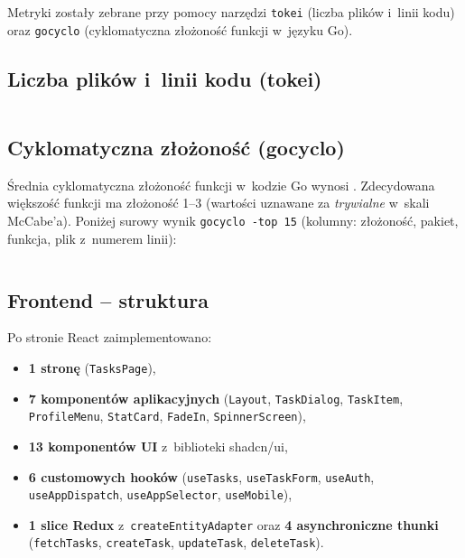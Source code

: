 \documentclass[12pt, a4paper, oneside]{article}
\begin{document}
Metryki zostały zebrane przy pomocy narzędzi \texttt{tokei} (liczba
plików i~linii kodu) oraz \texttt{gocyclo} (cyklomatyczna złożoność
funkcji w~języku Go).



\subsection{Liczba plików i~linii kodu (tokei)}

\inputminted[fontsize=\footnotesize,linenos=false,frame=single,breaklines=true]{text}{generated/tokei.txt}

\subsection{Cyklomatyczna złożoność (gocyclo)}

Średnia cyklomatyczna złożoność funkcji w~kodzie Go wynosi
\textbf{\metricsAvgCC}. Zdecydowana większość funkcji ma złożoność
1--3 (wartości uznawane za \emph{trywialne} w~skali McCabe'a).
Poniżej surowy wynik \texttt{gocyclo -top 15} (kolumny: złożoność,
pakiet, funkcja, plik z~numerem linii):

\inputminted[fontsize=\footnotesize,linenos=false,frame=single,breaklines=true]{text}{generated/gocyclo.txt}

\subsection{Frontend -- struktura}
Po stronie React zaimplementowano:
\begin{itemize}
  \item \textbf{1 stronę} (\texttt{TasksPage}),
  \item \textbf{7 komponentów aplikacyjnych} (\texttt{Layout}, \texttt{TaskDialog},
        \texttt{TaskItem}, \texttt{ProfileMenu}, \texttt{StatCard},
        \texttt{FadeIn}, \texttt{SpinnerScreen}),
  \item \textbf{13 komponentów UI} z~biblioteki shadcn/ui,
  \item \textbf{6 customowych hooków} (\texttt{useTasks}, \texttt{useTaskForm},
        \texttt{useAuth}, \texttt{useAppDispatch}, \texttt{useAppSelector},
        \texttt{useMobile}),
  \item \textbf{1 slice Redux} z~\texttt{createEntityAdapter} oraz
        \textbf{4 asynchroniczne thunki} (\texttt{fetchTasks},
        \texttt{createTask}, \texttt{updateTask}, \texttt{deleteTask}).
\end{itemize}
\end{document}
